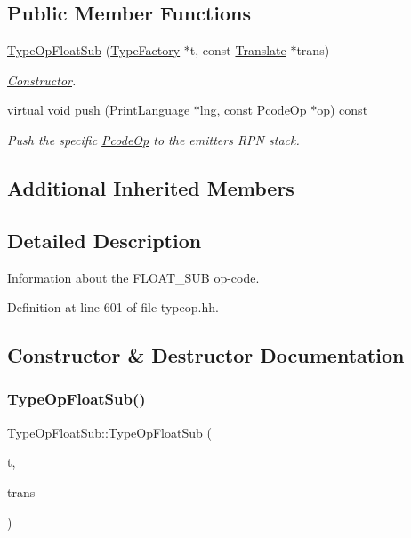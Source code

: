 \subsection*{Public Member Functions}
\begin{DoxyCompactItemize}
\item 
\mbox{\hyperlink{class_type_op_float_sub_aed3c859da0e1a6c2f2c2d7f2e403645b}{Type\+Op\+Float\+Sub}} (\mbox{\hyperlink{class_type_factory}{Type\+Factory}} $\ast$t, const \mbox{\hyperlink{class_translate}{Translate}} $\ast$trans)
\begin{DoxyCompactList}\small\item\em \mbox{\hyperlink{class_constructor}{Constructor}}. \end{DoxyCompactList}\item 
virtual void \mbox{\hyperlink{class_type_op_float_sub_a1a2134cf9ae8bad422b03219c2efe1d9}{push}} (\mbox{\hyperlink{class_print_language}{Print\+Language}} $\ast$lng, const \mbox{\hyperlink{class_pcode_op}{Pcode\+Op}} $\ast$op) const
\begin{DoxyCompactList}\small\item\em Push the specific \mbox{\hyperlink{class_pcode_op}{Pcode\+Op}} to the emitter\textquotesingle{}s R\+PN stack. \end{DoxyCompactList}\end{DoxyCompactItemize}
\subsection*{Additional Inherited Members}


\subsection{Detailed Description}
Information about the F\+L\+O\+A\+T\+\_\+\+S\+UB op-\/code. 

Definition at line 601 of file typeop.\+hh.



\subsection{Constructor \& Destructor Documentation}
\mbox{\label{class_type_op_float_sub_aed3c859da0e1a6c2f2c2d7f2e403645b}} 
\subsubsection{\texorpdfstring{TypeOpFloatSub()}{TypeOpFloatSub()}}
{\footnotesize\ttfamily Type\+Op\+Float\+Sub\+::\+Type\+Op\+Float\+Sub (\begin{DoxyParamCaption}\item[{\mbox{\hyperlink{class_type_factory}{Type\+Factory}} $\ast$}]{t,  }\item[{const \mbox{\hyperlink{class_translate}{Translate}} $\ast$}]{trans }\end{DoxyParamCaption})}



